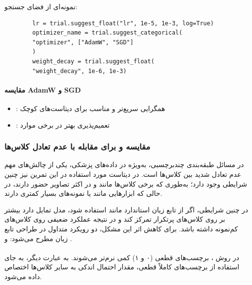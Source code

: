 \documentclass{article}
\begin{document}
نمونه‌ای از فضای جستجو:

\begin{LTR}
	\begin{verbatim}
		lr = trial.suggest_float("lr", 1e-5, 1e-3, log=True)
		optimizer_name = trial.suggest_categorical(
		"optimizer", ["AdamW", "SGD"]
		)
		weight_decay = trial.suggest_float(
		"weight_decay", 1e-6, 1e-3)
	\end{verbatim}
\end{LTR}

\paragraph{مقایسه AdamW و SGD}

\begin{itemize}
	\item {}: همگرایی سریع‌تر و مناسب برای دیتاست‌های کوچک
	\item {}: تعمیم‌پذیری بهتر در برخی موارد
\end{itemize}

\subsubsection{مقایسه  و  برای مقابله با عدم تعادل کلاس‌ها}

در مسائل طبقه‌بندی چندبرچسبی، به‌ویژه در داده‌های پزشکی، یکی از چالش‌های مهم عدم تعادل شدید بین کلاس‌ها است. 
در دیتاست مورد استفاده در این تمرین نیز چنین شرایطی وجود دارد؛ به‌طوری که برخی کلاس‌ها مانند 
 و  در اکثر تصاویر حضور دارند، در حالی که ابزارهایی مانند 
 یا  نمونه‌های بسیار کمتری دارند. 

در چنین شرایطی، اگر از تابع زیان استاندارد مانند  استفاده شود، 
مدل تمایل دارد بیشتر بر روی کلاس‌های پرتکرار تمرکز کند و در نتیجه عملکرد ضعیفی روی کلاس‌های کم‌نمونه داشته باشد. 
برای کاهش اثر این مشکل، دو رویکرد متداول در طراحی تابع زیان مطرح می‌شود: 
 و .

\paragraph{}

در روش ، برچسب‌های قطعی (۰ و ۱) کمی نرم‌تر می‌شوند. 
به عبارت دیگر، به جای استفاده از برچسب‌های کاملاً قطعی، مقدار احتمال اندکی به سایر کلاس‌ها اختصاص داده می‌شود.
\end{document}
